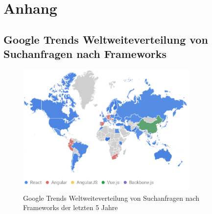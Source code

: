 

\chapter{Anhang}

\section*{Google Trends Weltweiteverteilung von Suchanfragen nach Frameworks}
\begin{figure}[h]
    \centering
    \includegraphics[width=0.8\textwidth]{img/Google Stats/2023-04-26 12_20_26-React, Angular, AngularJS, Vue.js, Backbone.js - Erkunden - Google Trends}
    \caption{Google Trends Weltweiteverteilung von Suchanfragen nach Frameworks der letzten 5 Jahre \cite{googleTrends}}
    \label{fig:google_trends_world}
\end{figure}

\newpage

